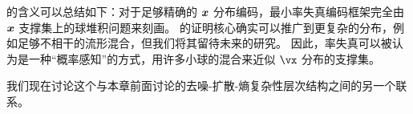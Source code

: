 \documentclass[../../book-main_zh.tex]{subfiles}
\begin{document}
%

 的含义可以总结如下：对于足够精确的 \(\bm{x}\) 分布编码，最小率失真编码框架完全由 \(\bm{x}\) 支撑集上的球堆积问题来刻画。  的证明核心确实可以推广到更复杂的分布，例如足够不相干的流形混合，但我们将其留待未来的研究。
因此，率失真可以被认为是一种“概率感知”的方式，用许多小球的混合来近似 \(\vx\) 分布的支撑集。

我们现在讨论这个与本章前面讨论的去噪-扩散-熵复杂性层次结构之间的另一个联系。
\end{document}
